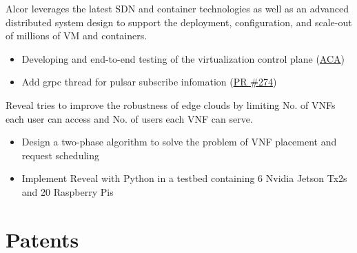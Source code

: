 \documentclass{resume}
\begin{document}
Alcor leverages the latest SDN and container technologies as well as an advanced distributed system design to support the deployment, configuration, and scale-out of millions of VM and containers.
\begin{itemize}
  \item Developing and end-to-end testing of the virtualization control plane (\href{https://github.com/futurewei-cloud/alcor-control-agent}{ACA})
  \item Add grpc thread for pulsar subscribe infomation (\href{https://github.com/futurewei-cloud/alcor-control-agent/pull/274}{PR \#274})
\end{itemize}

Reveal tries to improve the robustness of edge clouds by limiting No. of VNFs each user can access and No. of users each VNF can serve.
\begin{itemize}
  \item Design a two-phase algorithm to solve the problem of VNF placement and request scheduling
  \item Implement Reveal with Python in a testbed containing 6 Nvidia Jetson Tx2s and 20 Raspberry Pis
\end{itemize}

\section{Patents}



\end{document}
